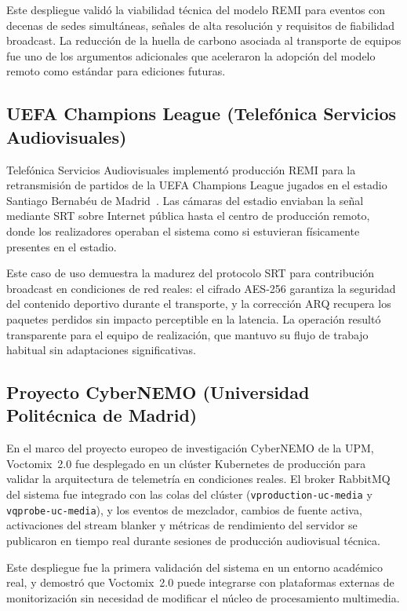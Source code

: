 Este despliegue validó la viabilidad técnica del modelo REMI para eventos con decenas de
sedes simultáneas, señales de alta resolución y requisitos de fiabilidad broadcast. La
reducción de la huella de carbono asociada al transporte de equipos fue uno de los
argumentos adicionales que aceleraron la adopción del modelo remoto como estándar para
ediciones futuras.

\subsection{UEFA Champions League (Telefónica Servicios Audiovisuales)}

Telefónica Servicios Audiovisuales implementó producción REMI para la retransmisión de
partidos de la UEFA Champions League jugados en el estadio Santiago Bernabéu de
Madrid~\cite{tsa_remi_2022}. Las cámaras del estadio enviaban la señal mediante SRT
sobre Internet pública hasta el centro de producción remoto, donde los realizadores
operaban el sistema como si estuvieran físicamente presentes en el estadio.

Este caso de uso demuestra la madurez del protocolo SRT para contribución broadcast
en condiciones de red reales: el cifrado AES-256 garantiza la seguridad del contenido
deportivo durante el transporte, y la corrección ARQ recupera los paquetes perdidos sin
impacto perceptible en la latencia. La operación resultó transparente para el equipo de
realización, que mantuvo su flujo de trabajo habitual sin adaptaciones significativas.

\subsection{Proyecto CyberNEMO (Universidad Politécnica de Madrid)}

En el marco del proyecto europeo de investigación CyberNEMO de la UPM, Voctomix~2.0 fue
desplegado en un clúster Kubernetes de producción para validar la arquitectura de
telemetría en condiciones reales. El broker RabbitMQ del sistema fue integrado con las
colas del clúster (\texttt{vproduction-uc-media} y \texttt{vqprobe-uc-media}), y los
eventos de mezclador, cambios de fuente activa, activaciones del stream blanker y
métricas de rendimiento del servidor se publicaron en tiempo real durante sesiones de
producción audiovisual técnica.

Este despliegue fue la primera validación del sistema en un entorno académico real,
y demostró que Voctomix~2.0 puede integrarse con plataformas externas de
monitorización sin necesidad de modificar el núcleo de procesamiento multimedia.

